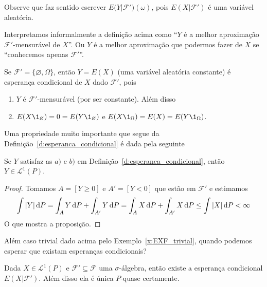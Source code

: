 \documentclass[../Notas_de_aula.tex]{subfiles}
\begin{document}
Observe que faz sentido escrever $E\big(Y|\mathcal{F}'\big)(\omega)$, pois $E(X|\mathcal{F}')$ é uma variável aleatória.

Interpretamos informalmente a definição acima como ``$Y$ é a melhor aproximação $\mathcal{F}'$-mensurável de $X$''.
Ou $Y$ é a melhor aproximação que podermos fazer de $X$ se ``conhecemos apenas $\mathcal{F}'$''.

\begin{example}
  \label{x:EXF_trivial}
  Se $\mathcal{F}' = \{\varnothing, \Omega\}$, então $Y = E(X)$ (uma variável aleatória constante) é esperança condicional de $X$ dado $\mathcal{F}'$, pois
  \begin{enumerate}[\quad a)]
  \item $Y$ é $\mathcal{F}'$-mensurável (por ser constante). Além disso
  \item $E(X \1_\varnothing) = 0 = E(Y \1_\varnothing)$ e $E(X \1_\Omega) = E(X) = E(Y \1_\Omega)$.
  \end{enumerate}
\end{example}

Uma propriedade muito importante que segue da Definição~\ref{d:esperanca_condicional} é dada pela seguinte

\begin{proposition}
  \label{p:ec_em_L1}
  Se $Y$ satisfaz as $a)$ e $b)$ em Definição~\ref{d:esperanca_condicional}, então $Y \in \mathcal{L}^1(P)$.
\end{proposition}

\begin{proof}
  Tomamos $A = [Y \geq 0]$ e $A' = [Y < 0]$ que estão em $\mathcal{F}'$ e estimamos
  \begin{equation}
    \int |Y| \mathop{}\!\mathrm{d} P = \int_A Y \mathop{}\!\mathrm{d} P + \int_{A'} Y \mathop{}\!\mathrm{d} P = \int_A X \mathop{}\!\mathrm{d} P + \int_{A'} X \mathop{}\!\mathrm{d} P \leq \int |X| \mathop{}\!\mathrm{d} P < \infty
  \end{equation}
  O que mostra a proposição.
\end{proof}

Além caso trivial dado acima pelo Exemplo~\ref{x:EXF_trivial}, quando podemos esperar que existam esperanças condicionais?

\begin{theorem}
  Dada $X \in \mathcal{L}^1(P)$ e $\mathcal{F}' \subseteq \mathcal{F}$ uma $\sigma$-álgebra, então existe a esperança condicional $E(X|\mathcal{F}')$.
  Além disso ela é única $P$-quase certamente.
\end{theorem}
\end{document}
